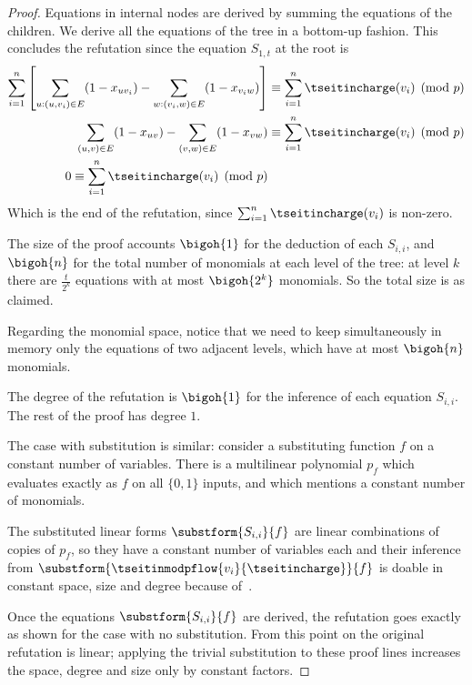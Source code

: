 \documentclass{toc}
\begin{document}
\begin{proof}
  Equations in internal nodes are derived by summing the
  equations of the children. We derive all the equations of the tree
  in a bottom-up fashion. This concludes the refutation since the
  equation $S_{1,t}$ at the root is
  \begin{align}
    \sum^{n}_{i=1}
    \left[
    \sum_{u:(u,v_{i})\in E} (1-x_{uv_{i}}) -\sum_{w:(v_{i},w)\in E} (1-x_{v_{i}w})
    \right]
    & \equiv \sum^{n}_{i=1} \tseitincharge(v_{i}) \pmod{p}
    \\
    \sum_{(u,v)\in E} (1-x_{uv}) -\sum_{(v,w)\in E} (1-x_{vw})
    & \equiv \sum^{n}_{i=1} \tseitincharge(v_{i}) \pmod{p}\\
    0 \equiv \sum^{n}_{i=1} \tseitincharge(v_{i}) \pmod{p}
  \end{align}
  Which is the end of the refutation, since $\sum^{n}_{i=1} \tseitincharge(v_{i})$
  is non-zero.

  The size of the proof accounts $\bigoh{1}$ for the deduction of each $S_{i,i}$, and $\bigoh{n}$ for the total number of monomials at each level of the tree: at level $k$ there are $\frac{t}{2^{k}}$ equations with at most  $\bigoh{2^{k}}$ monomials. So the total size is as claimed.

  Regarding the monomial space, notice that we need to keep simultaneously in memory only the equations of two adjacent levels, which have at most $\bigoh{n}$ monomials.

  The degree of the refutation is $\bigoh{1}$ for the inference of each equation $S_{i,i}$. The rest of the proof has degree $1$.

  The case with substitution is similar: consider a substituting
  function $f$ on a constant number of variables. There is a
  multilinear polynomial $p_{f}$ which evaluates exactly as $f$ on all
  $\{0,1\}$ inputs, and which mentions a constant number of monomials.

  The substituted linear forms $\substform{S_{i,i}}{f}$ are linear
  combinations of copies of $p_{f}$, so they have a constant
  number of variables each and their inference from
  $\substform{\tseitinmodpflow{v_{i}}{\tseitincharge}}{f}$ is doable in constant
  space, size and degree because of~.

  Once the equations $\substform{S_{i,i}}{f}$ are derived, the
  refutation goes exactly as shown for the case with no
  substitution. From this point on the original refutation is linear;
  applying the trivial substitution to these proof lines increases the
  space, degree and size only by constant factors.
\end{proof}
\end{document}
